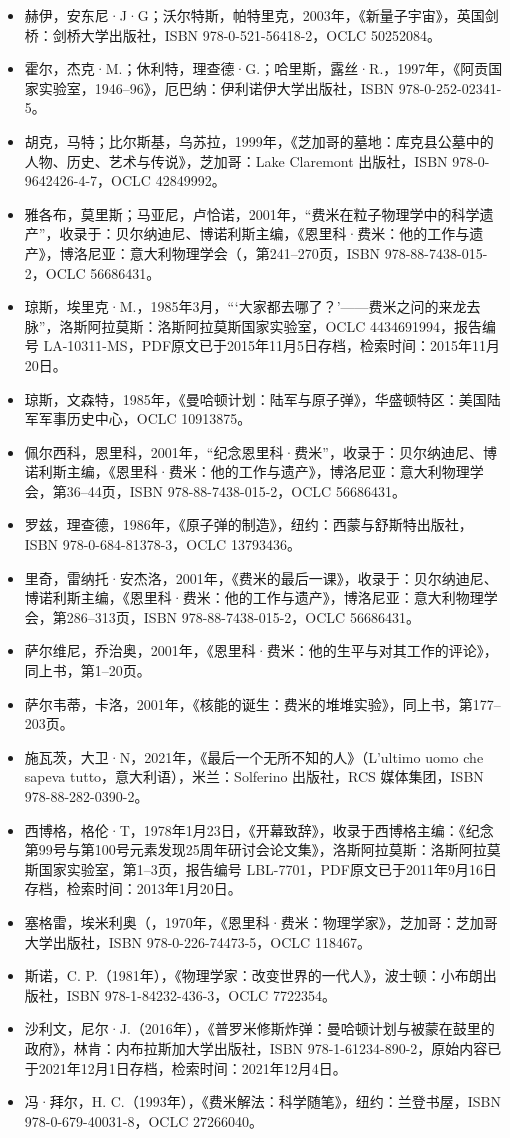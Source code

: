 \begin{itemize}
\item 赫伊，安东尼·J·G；沃尔特斯，帕特里克，2003年，《新量子宇宙》，英国剑桥：剑桥大学出版社，ISBN 978-0-521-56418-2，OCLC 50252084。
\item 霍尔，杰克·M.；休利特，理查德·G.；哈里斯，露丝·R.，1997年，《阿贡国家实验室，1946–96》，厄巴纳：伊利诺伊大学出版社，ISBN 978-0-252-02341-5。
\item 胡克，马特；比尔斯基，乌苏拉，1999年，《芝加哥的墓地：库克县公墓中的人物、历史、艺术与传说》，芝加哥：Lake Claremont 出版社，ISBN 978-0-9642426-4-7，OCLC 42849992。
\item 雅各布，莫里斯；马亚尼，卢恰诺，2001年，“费米在粒子物理学中的科学遗产”，收录于：贝尔纳迪尼、博诺利斯主编，《恩里科·费米：他的工作与遗产》，博洛尼亚：意大利物理学会（，第241–270页，ISBN 978-88-7438-015-2，OCLC 56686431。
\item 琼斯，埃里克·M.，1985年3月，“‘大家都去哪了？’——费米之问的来龙去脉”，洛斯阿拉莫斯：洛斯阿拉莫斯国家实验室，OCLC 4434691994，报告编号 LA-10311-MS，PDF原文已于2015年11月5日存档，检索时间：2015年11月20日。
\item 琼斯，文森特，1985年，《曼哈顿计划：陆军与原子弹》，华盛顿特区：美国陆军军事历史中心，OCLC 10913875。
\item 佩尔西科，恩里科，2001年，“纪念恩里科·费米”，收录于：贝尔纳迪尼、博诺利斯主编，《恩里科·费米：他的工作与遗产》，博洛尼亚：意大利物理学会，第36–44页，ISBN 978-88-7438-015-2，OCLC 56686431。
\item 罗兹，理查德，1986年，《原子弹的制造》，纽约：西蒙与舒斯特出版社，ISBN 978-0-684-81378-3，OCLC 13793436。
\item 里奇，雷纳托·安杰洛，2001年，《费米的最后一课》，收录于：贝尔纳迪尼、博诺利斯主编，《恩里科·费米：他的工作与遗产》，博洛尼亚：意大利物理学会，第286–313页，ISBN 978-88-7438-015-2，OCLC 56686431。
\item 萨尔维尼，乔治奥，2001年，《恩里科·费米：他的生平与对其工作的评论》，同上书，第1–20页。
\item 萨尔韦蒂，卡洛，2001年，《核能的诞生：费米的堆堆实验》，同上书，第177–203页。
\item 施瓦茨，大卫·N，2021年，《最后一个无所不知的人》（L'ultimo uomo che sapeva tutto，意大利语），米兰：Solferino 出版社，RCS 媒体集团，ISBN 978-88-282-0390-2。
\item 西博格，格伦·T，1978年1月23日，《开幕致辞》，收录于西博格主编：《纪念第99号与第100号元素发现25周年研讨会论文集》，洛斯阿拉莫斯：洛斯阿拉莫斯国家实验室，第1–3页，报告编号 LBL-7701，PDF原文已于2011年9月16日存档，检索时间：2013年1月20日。
\item 塞格雷，埃米利奥（，1970年，《恩里科·费米：物理学家》，芝加哥：芝加哥大学出版社，ISBN 978-0-226-74473-5，OCLC 118467。
\item 斯诺，C. P.（1981年），《物理学家：改变世界的一代人》，波士顿：小布朗出版社，ISBN 978-1-84232-436-3，OCLC 7722354。
\item 沙利文，尼尔·J.（2016年），《普罗米修斯炸弹：曼哈顿计划与被蒙在鼓里的政府》，林肯：内布拉斯加大学出版社，ISBN 978-1-61234-890-2，原始内容已于2021年12月1日存档，检索时间：2021年12月4日。
\item 冯·拜尔，H. C.（1993年），《费米解法：科学随笔》，纽约：兰登书屋，ISBN 978-0-679-40031-8，OCLC 27266040。
\end{itemize}
